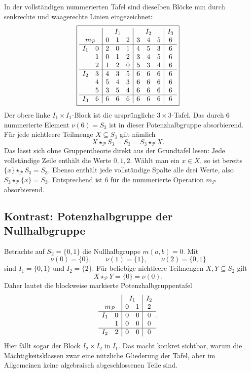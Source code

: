 \documentclass[main.tex]{subfiles}
\begin{document}
In der vollständigen nummerierten Tafel sind dieselben Blöcke nun durch
senkrechte und waagerechte Linien eingezeichnet:
\[
\boxed{
\begin{array}{cc|ccc|ccc|c}
\multicolumn{2}{c|}{}
  &\multicolumn{3}{c|}{I_1}
  &\multicolumn{3}{c|}{I_2}
  &\multicolumn{1}{c}{I_3}\\
\multicolumn{2}{c|}{m_{\mathcal P}}
  &0&1&2&3&4&5&6\\\hline
I_1&0&2&0&1&4&5&3&6\\
   &1&0&1&2&3&4&5&6\\
   &2&1&2&0&5&3&4&6\\\hline
I_2&3&4&3&5&6&6&6&6\\
   &4&5&4&3&6&6&6&6\\
   &5&3&5&4&6&6&6&6\\\hline
I_3&6&6&6&6&6&6&6&6
\end{array}}
\]
Der obere linke \(I_1\times I_1\)-Block ist die ursprüngliche
\(3\times3\)-Tafel.  Das durch \(6\) nummerierte Element
\(\nu(6)=S_3\) ist in dieser Potenzhalbgruppe absorbierend.  Für jede
nichtleere Teilmenge \(X\subseteq S_3\) gilt nämlich
\[
  X\star_{\mathcal P}S_3
  =
  S_3
  =
  S_3\star_{\mathcal P}X.
\]
Das lässt sich ohne Gruppentheorie direkt aus der Grundtafel lesen: Jede
vollständige Zeile enthält die Werte \(0,1,2\).  Wählt man ein
\(x\in X\), so ist bereits
\(\{x\}\star_{\mathcal P}S_3=S_3\).  Ebenso enthält jede vollständige
Spalte alle drei Werte, also
\(S_3\star_{\mathcal P}\{x\}=S_3\).
Entsprechend ist \(6\) für die nummerierte Operation \(m_{\mathcal P}\)
absorbierend.


\subsection{Kontrast: Potenzhalbgruppe der Nullhalbgruppe}

Betrachte auf \(S_2=\{0,1\}\) die Nullhalbgruppe \(m(a,b)=0\).  Mit
\[
  \nu(0)=\{0\},
  \qquad
  \nu(1)=\{1\},
  \qquad
  \nu(2)=\{0,1\}
\]
sind \(I_1=\{0,1\}\) und \(I_2=\{2\}\).  Für beliebige nichtleere
Teilmengen \(X,Y\subseteq S_2\) gilt
\[
  X\star_{\mathcal P}Y=\{0\}=\nu(0).
\]
Daher lautet die blockweise markierte Potenzhalbgruppentafel
\[
\begin{array}{cc|cc|c}
\multicolumn{2}{c|}{}
  &\multicolumn{2}{c|}{I_1}
  &\multicolumn{1}{c}{I_2}\\
\multicolumn{2}{c|}{m_{\mathcal P}}&0&1&2\\\hline
I_1&0&0&0&0\\
   &1&0&0&0\\\hline
I_2&2&0&0&0
\end{array}.
\]
Hier fällt sogar der Block \(I_2\times I_2\) in \(I_1\).  Das macht konkret
sichtbar, warum die Mächtigkeitsklassen zwar eine nützliche Gliederung der
Tafel, aber im Allgemeinen keine algebraisch abgeschlossenen Teile sind.
\end{document}
